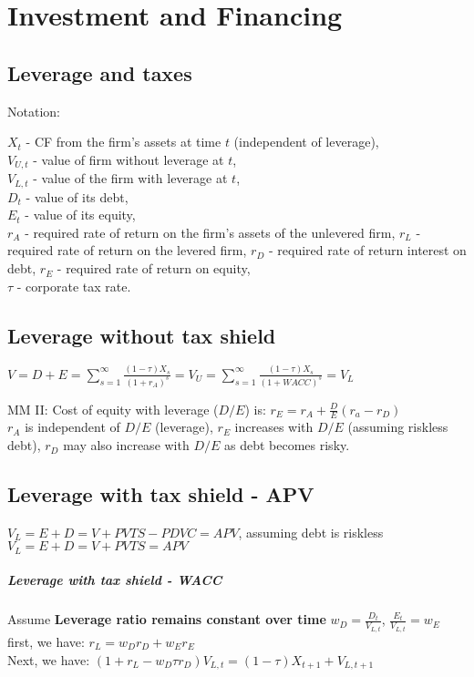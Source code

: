 \section{Investment and Financing}

\subsection*{Leverage and taxes}

Notation: 

$X_t$ - CF from the firm’s assets at time $t$ (independent of leverage), \\
$V_{U,t}$ - value of firm without leverage at $t$, \\
$V_{L,t}$ - value of the firm with leverage at $t$, \\
$D_t$ - value of its debt, \\
$E_t$ - value of its equity, \\
$r_A$ - required rate of return on the firm's assets of the unlevered firm,
$r_L$ - required rate of return on the levered firm,
$r_D$ - required rate of return interest on debt,
$r_E$ - required rate of return on equity, \\
$\tau$ - corporate tax rate.

\subsection*{Leverage without tax shield}

$V = D+E = \sum_{s=1}^{\infty} \frac{(1-\tau)X_s}{(1+r_A)^s} =V_U =\sum_{s=1}^{\infty} \frac{(1-\tau)X_s}{(1+WACC)^s} =V_L$

MM II: Cost of equity with leverage ($D/E$) is:
$r_E=r_A+\frac{D}{E}(r_a-r_D)$ \\
$r_A$ is independent of $D/E$ (leverage),
$r_E$ increases with $D/E$ (assuming riskless debt),
$r_D$ may also increase with $D/E$ as debt becomes risky.


\subsection*{Leverage with tax shield - APV}

$V_L = E+D = V+PVTS-PDVC = APV$, assuming debt is riskless $V_L = E+D = V+PVTS = APV$

\subparagraph*{Leverage with tax shield - WACC}
Assume {\bf Leverage ratio remains constant over time} $w_D = \frac{D_t}{V_{L,t}}$, $\frac{E_t}{V_{L,t}}=w_E$ \\
first, we have: 
$r_L = w_D r_D + w_E r_E$ \\
Next, we have: 
$(1 + r_L - w_D\tau r_D) V_{L,t}=(1-\tau) X_{t+1} + V_{L,t+1}$ \\

